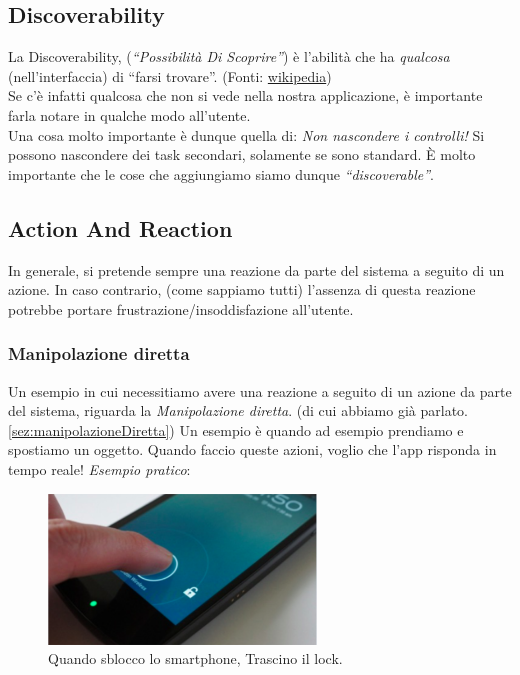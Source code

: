 \documentclass[oneside]{book}
\begin{document}
		\subsection{Discoverability} \label{Discoverability}
			La Discoverability, (\emph{``Possibilità Di Scoprire''}) è l'abilità che ha \emph{qualcosa} (nell'interfaccia) di ``farsi trovare''. (Fonti: \href{https://en.wikipedia.org/wiki/Discoverability}{wikipedia})\\
			Se c'è infatti qualcosa che non si vede nella nostra applicazione, è importante farla notare in qualche modo all'utente. \\

			Una cosa molto importante è dunque quella di: \emph{Non nascondere i controlli!} Si possono nascondere dei task secondari, solamente se sono standard. È molto importante che le cose che aggiungiamo siamo dunque \emph{``discoverable''}. 

		\subsection{Action And Reaction}
			In generale, si pretende sempre una reazione da parte del sistema a seguito di un azione. In caso contrario, (come sappiamo tutti) l'assenza di questa reazione potrebbe portare frustrazione/insoddisfazione all'utente.

			\subsubsection{Manipolazione diretta}
				Un esempio in cui necessitiamo avere una reazione a seguito di un azione da parte del sistema, riguarda la 
				\emph{Manipolazione diretta}. (di cui abbiamo già parlato. \ref{sez:manipolazioneDiretta}) Un esempio è quando ad esempio prendiamo e spostiamo un oggetto. Quando faccio queste azioni, voglio che l'app risponda in tempo reale! \emph{Esempio pratico}:
				\begin{figure}[htbp]
				\centering
				\includegraphics[height = 40mm]{images/sblocco.png}
				\caption{Quando sblocco lo smartphone, Trascino il lock.}
				\end{figure}
\end{document}
